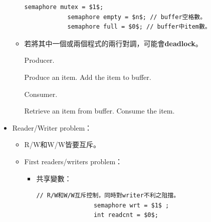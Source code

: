 \begin{itemize}
\begin{itemize}
\begin{lstlisting}[caption={Shared variables of Producer-consumer problem.}, captionpos=b, mathescape=true]
            semaphore mutex = $1$;
            semaphore empty = $n$; // buffer空格數。
            semaphore full = $0$; // buffer中item數。
        \end{lstlisting}
        \item 若將其中一個或兩個程式的兩行對調，可能會\textbf{deadlock}。
        \begin{algorithm}[H]
            \caption{Producer.}
            \begin{algorithmic}[1]
                    \Repeat
                        \State Produce an item.
                        \State {}
                        \State {}
                        \State Add the item to buffer.
                        \State {}
                        \State {}
                \EndFunction
            \end{algorithmic}
        \end{algorithm}
        \begin{algorithm}[H]
            \caption{Consumer.}
            \begin{algorithmic}[1]
                    \Repeat
                        \State {}
                        \State {}
                        \State Retrieve an item from buffer.
                        \State {}
                        \State {}
                        \State Consume the item.
                \EndFunction
            \end{algorithmic}
        \end{algorithm}
    \end{itemize}
    \item Reader/Writer problem：\begin{itemize}
        \item R/W和W/W皆要互斥。
        \item First readers/writers problem：\begin{itemize}
            \item 共享變數：\begin{lstlisting}[caption={Shared variables of First Reader/Writer problem.}, captionpos=b, mathescape=true]
                // R/W和W/W互斥控制，同時對writer不利之阻擋。
                semaphore wrt = $1$ ;
                int readcnt = $0$;

\end{lstlisting}
\end{itemize}
\end{itemize}
\end{itemize}
